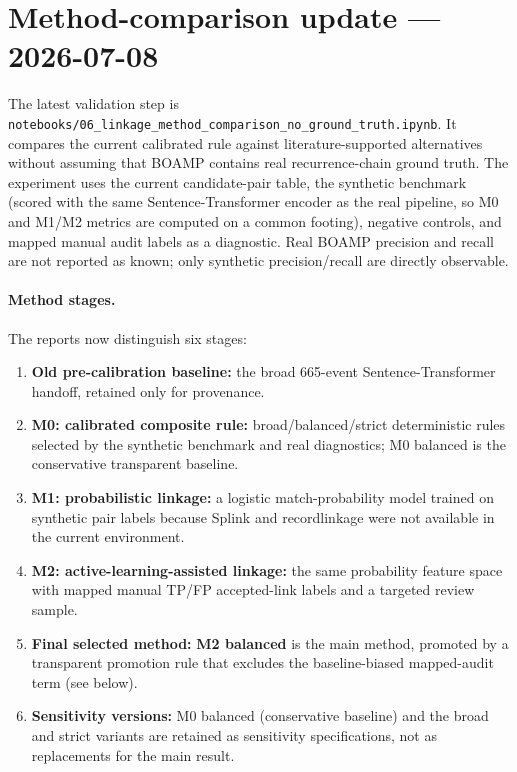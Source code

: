\documentclass[12pt, a4paper]{article}
\begin{document}
\section*{Method-comparison update --- 2026-07-08}

The latest validation step is
\texttt{notebooks/06\_linkage\_method\_comparison\_no\_ground\_truth.ipynb}.
It compares the current calibrated rule against literature-supported
alternatives without assuming that BOAMP contains real recurrence-chain ground
truth. The experiment uses the current candidate-pair table, the synthetic
benchmark (scored with the same Sentence-Transformer encoder as the real
pipeline, so M0 and M1/M2 metrics are computed on a common footing), negative
controls, and mapped manual audit labels as a diagnostic. Real BOAMP precision
and recall are not reported as known; only synthetic precision/recall are
directly observable.

\paragraph{Method stages.}
The reports now distinguish six stages:
\begin{enumerate}[leftmargin=1.4em,itemsep=1pt]
  \item \textbf{Old pre-calibration baseline:} the broad 665-event
        Sentence-Transformer handoff, retained only for provenance.
  \item \textbf{M0: calibrated composite rule:} broad/balanced/strict
        deterministic rules selected by the synthetic benchmark and real
        diagnostics; M0 balanced is the conservative transparent baseline.
  \item \textbf{M1: probabilistic linkage:} a logistic match-probability model
        trained on synthetic pair labels because Splink and recordlinkage were
        not available in the current environment.
  \item \textbf{M2: active-learning-assisted linkage:} the same probability
        feature space with mapped manual TP/FP accepted-link labels and a
        targeted review sample.
  \item \textbf{Final selected method:} \textbf{M2 balanced} is the main
        method, promoted by a transparent promotion rule that excludes the
        baseline-biased mapped-audit term (see below).
  \item \textbf{Sensitivity versions:} M0 balanced (conservative baseline) and
        the broad and strict variants are retained as sensitivity
        specifications, not as replacements for the main result.
\end{enumerate}
\end{document}
